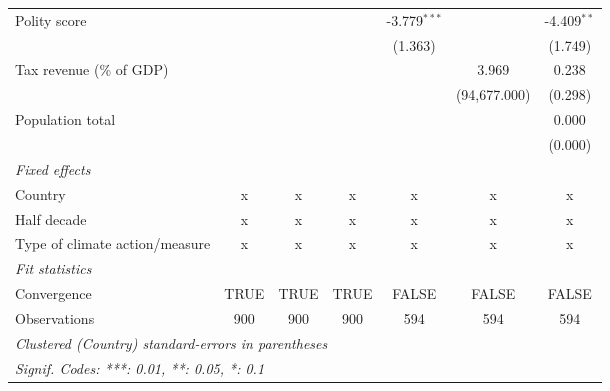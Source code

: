 \begin{tabular}{lcccccc}
   Polity score                                                  &               &                &                & -3.779$^{***}$ &               & -4.409$^{**}$\\   
                                                                 &               &                &                & (1.363)        &               & (1.749)\\   
   Tax revenue (\% of GDP)                                       &               &                &                &                & 3.969         & 0.238\\   
                                                                 &               &                &                &                & (94,677.000)  & (0.298)\\   
   Population total                                              &               &                &                &                &               & 0.000\\   
                                                                 &               &                &                &                &               & (0.000)\\   
   \emph{Fixed effects}\\
   Country                                                       & x             & x              & x              & x              & x             & x\\  
   Half decade                                                   & x             & x              & x              & x              & x             & x\\  
   Type of climate action/measure                                & x             & x              & x              & x              & x             & x\\  
   \midrule \emph{Fit statistics}\\
   Convergence                                                   &TRUE           & TRUE           & TRUE           & FALSE          & FALSE         & FALSE\\  
   Observations                                                  & 900           & 900            & 900            & 594            & 594           & 594\\  
   \midrule
   \multicolumn{7}{l}{\emph{Clustered (Country) standard-errors in parentheses}}\\
   \multicolumn{7}{l}{\emph{Signif. Codes: ***: 0.01, **: 0.05, *: 0.1}}\\
\end{tabular}
\par\endgroup


